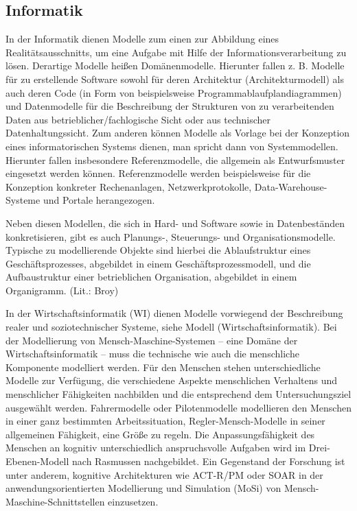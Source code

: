 \documentclass[a4paper, 12pt]{scrartcl}
\begin{document}
\subsection{Informatik}
In der Informatik dienen Modelle zum einen zur Abbildung eines Realitätsausschnitts, um eine Aufgabe mit Hilfe der Informationsverarbeitung zu lösen. Derartige Modelle heißen Domänenmodelle. Hierunter fallen z. B. Modelle für zu erstellende Software sowohl für deren Architektur (Architekturmodell) als auch deren Code (in Form von beispielsweise Programmablaufplandiagrammen) und Datenmodelle für die Beschreibung der Strukturen von zu verarbeitenden Daten aus betrieblicher/fachlogische Sicht oder aus technischer Datenhaltungssicht. Zum anderen können Modelle als Vorlage bei der Konzeption eines informatorischen Systems dienen, man spricht dann von Systemmodellen. Hierunter fallen insbesondere Referenzmodelle, die allgemein als Entwurfsmuster eingesetzt werden können. Referenzmodelle werden beispielsweise für die Konzeption konkreter Rechenanlagen, Netzwerkprotokolle, Data-Warehouse-Systeme und Portale herangezogen.

Neben diesen Modellen, die sich in Hard- und Software sowie in Datenbeständen konkretisieren, gibt es auch Planungs-, Steuerungs- und Organisationsmodelle. Typische zu modellierende Objekte sind hierbei die Ablaufstruktur eines Geschäftsprozesses, abgebildet in einem Geschäftsprozessmodell, und die Aufbaustruktur einer betrieblichen Organisation, abgebildet in einem Organigramm. (Lit.: Broy)

In der Wirtschaftsinformatik (WI) dienen Modelle vorwiegend der Beschreibung realer und soziotechnischer Systeme, siehe Modell (Wirtschaftsinformatik). Bei der Modellierung von Mensch-Maschine-Systemen – eine Domäne der Wirtschaftsinformatik – muss die technische wie auch die menschliche Komponente modelliert werden. Für den Menschen stehen unterschiedliche Modelle zur Verfügung, die verschiedene Aspekte menschlichen Verhaltens und menschlicher Fähigkeiten nachbilden und die entsprechend dem Untersuchungsziel ausgewählt werden. Fahrermodelle oder Pilotenmodelle modellieren den Menschen in einer ganz bestimmten Arbeitssituation, Regler-Mensch-Modelle in seiner allgemeinen Fähigkeit, eine Größe zu regeln. Die Anpassungsfähigkeit des Menschen an kognitiv unterschiedlich anspruchsvolle Aufgaben wird im Drei-Ebenen-Modell nach Rasmussen nachgebildet. Ein Gegenstand der Forschung ist unter anderem, kognitive Architekturen wie ACT-R/PM oder SOAR in der anwendungsorientierten Modellierung und Simulation (MoSi) von Mensch-Maschine-Schnittstellen einzusetzen.
\end{document}
